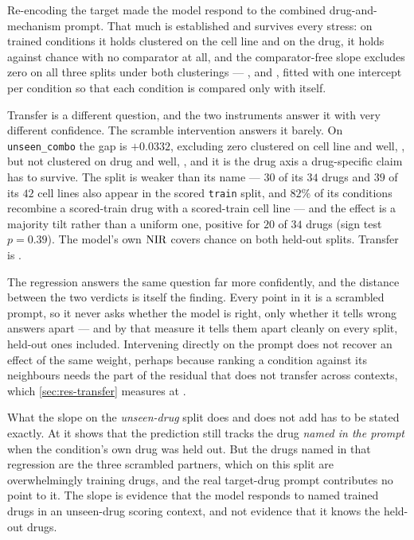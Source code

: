 %
\begin{claim}
  Re-encoding the target made the model respond to the combined drug-and-mechanism
  prompt. That much is established and survives every stress: on trained conditions
  it holds clustered on the cell line and on the drug, it holds against chance with
  no comparator at all, and the comparator-free slope excludes zero on all three
  splits under both clusterings --- ,
   and , fitted with one
  intercept per condition so that each condition is compared only with itself.
  
  Transfer is a different question, and the two instruments answer it with very
  different confidence. The scramble intervention answers it barely. On
  \texttt{unseen\_combo} the gap is $+0.0332$, excluding zero clustered on cell line
  and well, , but not clustered on drug and well,
  , and it is the drug axis a drug-specific claim has
  to survive. The split is weaker than its name --- $30$ of its $34$ drugs and $39$ of its $42$ cell lines also appear in the scored \texttt{train} split, and $82\%$ of its conditions recombine a scored-train drug with a scored-train cell line --- and the effect is a majority tilt rather
  than a uniform one, positive for $20$ of $34$ drugs (sign test $p = 0.39$). The
  model's own $\textrm{NIR}$ covers chance on both held-out splits. Transfer is
  \notestablished.
  
  The regression answers the same question far more confidently, and the distance
  between the two verdicts is itself the finding. Every point in it is a scrambled
  prompt, so it never asks whether the model is right, only whether it tells wrong
  answers apart --- and by that measure it tells them apart cleanly on every split,
  held-out ones included. Intervening directly on the prompt does not recover an
  effect of the same weight, perhaps because ranking a condition against its neighbours
  needs the part of the residual that does not transfer across contexts, which
  \cref{sec:res-transfer} measures at . 
  
  What the slope on the \emph{unseen-drug} split does and does not add has to be
  stated exactly. At  it shows that the prediction still
  tracks the drug \emph{named in the prompt} when the condition's own drug was held
  out. But the drugs named in that regression are the three scrambled partners,
  which on this split are overwhelmingly training drugs, and the real target-drug
  prompt contributes no point to it. The slope is evidence that the model responds
  to named trained drugs in an unseen-drug scoring context, and not evidence that it
  knows the held-out drugs.
  \end{claim}
